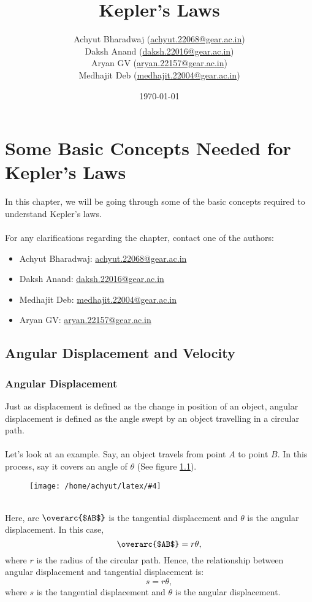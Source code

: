 \documentclass[a4paper]{report}
\title{Kepler's Laws}
\author{Achyut Bharadwaj (\href{mailto:achyut.22068@gear.ac.in}{achyut.22068@gear.ac.in})\\ 
  Daksh Anand (\href{mailto:daksh.22016@gear.ac.in}{daksh.22016@gear.ac.in})\\
  Aryan GV (\href{mailto:aryan.22157@gear.ac.in}{aryan.22157@gear.ac.in})\\ 
Medhajit Deb (\href{mailto:medhajit.22004@gear.ac.in}{medhajit.22004@gear.ac.in})}
\date{\today}
\newcommand{\mkfig}[5]{
  \begin{figure}[#1]
    \centering
    \texttt{[image: /home/achyut/latex/\#4]}
    \caption{\centering{#5}}
    \label{fig.#2}
  \end{figure}
}
\begin{document}
\maketitle
\tableofcontents
\pagebreak
\listoffigures
\noindent

\chapter{Some Basic Concepts Needed for Kepler's Laws}
In this chapter, we will be going through some of the basic concepts required to understand Kepler's laws.\\\\
For any clarifications regarding the chapter, contact one of the authors: 
\begin{itemize}
  \item Achyut Bharadwaj: \href{mailto:achyut.22068@gear.ac.in}{achyut.22068@gear.ac.in}
  \item Daksh Anand: \href{mailto:daksh.22016@gear.ac.in}{daksh.22016@gear.ac.in}
  \item Medhajit Deb: \href{mailto:medhajit.22004@gear.ac.in}{medhajit.22004@gear.ac.in}
  \item Aryan GV: \href{mailto:aryan.22157@gear.ac.in}{aryan.22157@gear.ac.in}
\end{itemize}
\section{Angular Displacement and Velocity}
\subsection{Angular Displacement}
Just as displacement is defined as the change in position of an object, angular displacement is defined as
the angle swept by an object travelling in a circular path.\\\\
Let's look at an example. Say, an object travels from point $A$ to point $B$. In this process, say it 
covers an angle of $\theta$ (See figure \ref{fig.4}).
\mkfig{h!}{4}{2}{presentation.4.png}{An example} \\
Here, arc \(\overarc{$AB$}\) is the tangential displacement and $\theta$ is the angular displacement.
In this case, $$\text{\(\overarc{$AB$}\)}=r\theta,$$ where $r$ is the radius of the circular path.
Hence, the relationship between angular displacement and tangential displacement is: $$s=r\theta,$$
where $s$ is the tangential displacement and $\theta$ is the angular displacement.
\end{document}
